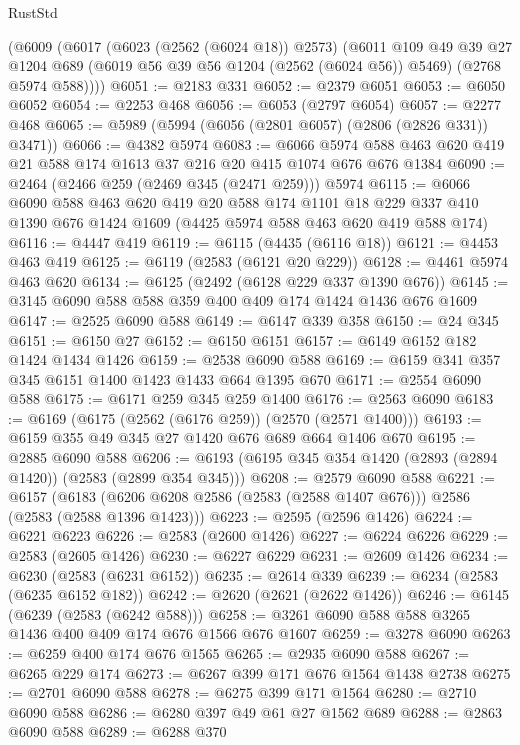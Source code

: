 \begin{lexlean}{RustStd}
\begin{coremodule}
{\begin{coremodule}
{{{{{{{{{{{{{{{    (@6009
      (@6017
        (@6023 (@2562 (@6024 @18)) @2573)
        (@6011
          @109
          @49
          @39
          @27
          @1204
          @689
          (@6019 @56 @39 @56 @1204 (@2562 (@6024 @56)) @5469)
          (@2768 @5974 @588))))
@6051 := @2183 @331
@6052 := @2379 @6051
@6053 := @6050 @6052
@6054 := @2253 @468
@6056 := @6053 (@2797 @6054)
@6057 := @2277 @468
@6065 := @5989 (@5994 (@6056 (@2801 @6057) (@2806 (@2826 @331)) @3471))
@6066 := @4382 @5974
@6083 := @6066 @5974 @588 @463 @620 @419 @21 @588 @174 @1613 @37 @216 @20 @415 @1074 @676 @676 @1384
@6090 := @2464 (@2466 @259 (@2469 @345 (@2471 @259))) @5974
@6115 := @6066
    @6090
    @588
    @463
    @620
    @419
    @20
    @588
    @174
    @1101
    @18
    @229
    @337
    @410
    @1390
    @676
    @1424
    @1609
    (@4425 @5974 @588 @463 @620 @419 @588 @174)
@6116 := @4447 @419
@6119 := @6115 (@4435 (@6116 @18))
@6121 := @4453 @463 @419
@6125 := @6119 (@2583 (@6121 @20 @229))
@6128 := @4461 @5974 @463 @620
@6134 := @6125 (@2492 (@6128 @229 @337 @1390 @676))
@6145 := @3145 @6090 @588 @588 @359 @400 @409 @174 @1424 @1436 @676 @1609
@6147 := @2525 @6090 @588
@6149 := @6147 @339 @358
@6150 := @24 @345
@6151 := @6150 @27
@6152 := @6150 @6151
@6157 := @6149 @6152 @182 @1424 @1434 @1426
@6159 := @2538 @6090 @588
@6169 := @6159 @341 @357 @345 @6151 @1400 @1423 @1433 @664 @1395 @670
@6171 := @2554 @6090 @588
@6175 := @6171 @259 @345 @259 @1400
@6176 := @2563 @6090
@6183 := @6169 (@6175 (@2562 (@6176 @259)) (@2570 (@2571 @1400)))
@6193 := @6159 @355 @49 @345 @27 @1420 @676 @689 @664 @1406 @670
@6195 := @2885 @6090 @588
@6206 := @6193 (@6195 @345 @354 @1420 (@2893 (@2894 @1420)) (@2583 (@2899 @354 @345)))
@6208 := @2579 @6090 @588
@6221 := @6157
    (@6183 (@6206 @6208 @2586 (@2583 (@2588 @1407 @676))) @2586 (@2583 (@2588 @1396 @1423)))
@6223 := @2595 (@2596 @1426)
@6224 := @6221 @6223
@6226 := @2583 (@2600 @1426)
@6227 := @6224 @6226
@6229 := @2583 (@2605 @1426)
@6230 := @6227 @6229
@6231 := @2609 @1426
@6234 := @6230 (@2583 (@6231 @6152))
@6235 := @2614 @339
@6239 := @6234 (@2583 (@6235 @6152 @182))
@6242 := @2620 (@2621 (@2622 @1426))
@6246 := @6145 (@6239 (@2583 (@6242 @588)))
@6258 := @3261 @6090 @588 @588 @3265 @1436 @400 @409 @174 @676 @1566 @676 @1607
@6259 := @3278 @6090
@6263 := @6259 @400 @174 @676 @1565
@6265 := @2935 @6090 @588
@6267 := @6265 @229 @174
@6273 := @6267 @399 @171 @676 @1564 @1438 @2738
@6275 := @2701 @6090 @588
@6278 := @6275 @399 @171 @1564
@6280 := @2710 @6090 @588
@6286 := @6280 @397 @49 @61 @27 @1562 @689
@6288 := @2863 @6090 @588
@6289 := @6288 @370
}}}}}}}}}}}}}}}
\end{coremodule}}
\end{coremodule}
\end{lexlean}
